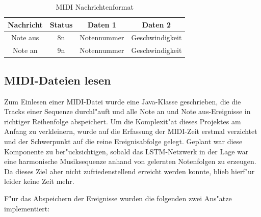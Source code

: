 {\begin{table} [h]
\centering
\begin{tabular}{|c|c|c|c|}\hline
   \textbf{Nachricht} & \textbf{Status} & \textbf{Daten 1} & \textbf{Daten 2}\\ \hline
   Note aus & 8n & Notennummer & Geschwindigkeit \\ \hline
   Note an & 9n & Notennummer & Geschwindigkeit \\ \hline
 \end{tabular}
\caption{MIDI Nachrichtenformat}
\label{tbl:midiMess} %
\end{table}


\subsection{MIDI-Dateien lesen}
Zum Einlesen einer MIDI-Datei wurde eine Java-Klasse geschrieben, die die Tracks einer Sequenze durchl"auft und alle {\glqq}Note an{\grqq} und {\glqq}Note aus{\grqq}-Ereignisse in richtiger Reihenfolge abspeichert. Um die Komplexit"at dieses Projektes am Anfang zu verkleinern, wurde auf die Erfassung der MIDI-Zeit erstmal verzichtet und der Schwerpunkt auf die reine Ereignisabfolge gelegt. Geplant war diese Komponente zu ber"ucksichtigen, sobald das LSTM-Netzwerk in der Lage war eine harmonische Musiksequenze anhand von gelernten Notenfolgen zu erzeugen. Da dieses Ziel aber nicht zufriedenstellend erreicht werden konnte, blieb hierf"ur leider keine Zeit mehr.

F"ur das Abspeichern der Ereignisse wurden die folgenden zwei Ans"atze implementiert:

}
